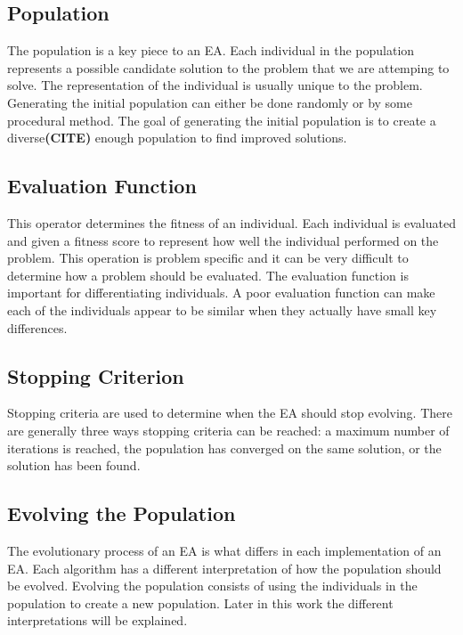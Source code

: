 \subsection{Population}

The population is a key piece to an EA. Each individual in the population represents a possible candidate solution to the problem that we are attemping to solve. The representation of the individual is usually unique to the problem. Generating the initial population can either be done randomly or by some procedural method. The goal of generating the initial population is to create a diverse\textbf{(CITE)} enough population to find improved solutions.

\subsection{Evaluation Function}
\label{subsec:fitness-function}

This operator determines the fitness of an individual. Each individual is evaluated and given a fitness score to represent how well the individual performed on the problem. This operation is problem specific and it can be very difficult to determine how a problem should be evaluated. The evaluation function is important for differentiating individuals. A poor evaluation function can make each of the individuals appear to be similar when they actually have small key differences. 

\subsection{Stopping Criterion}

Stopping criteria are used to determine when the EA should stop evolving. There are generally three ways stopping criteria can be reached: a maximum number of iterations is reached, the population has converged on the same solution, or the solution has been found.

\subsection{Evolving the Population}

The evolutionary process of an EA is what differs in each implementation of an EA. Each algorithm has a different interpretation of how the population should be evolved. Evolving the population consists of using the individuals in the population to create a new population. Later in this work the different interpretations will be explained.
